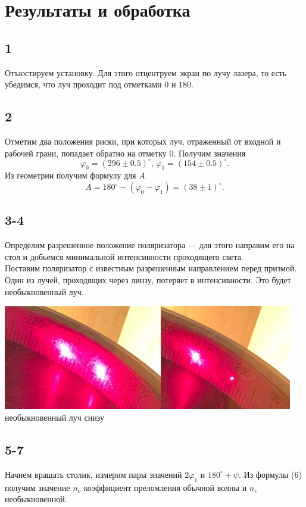 \section{Результаты и обработка}
\subsection{1}
Отъюстируем установку. Для этого отцентруем экран по лучу лазера, то есть убедимся, что луч проходит под отметками $0$ и $180$.
\subsection{2}
Отметим два положения риски, при которых луч, отраженный от входной и рабочей грани, попадает обратно на отметку $0$. Получим значения
\[\varphi_0 = (296\pm0.5)^\circ,\,\varphi_1 = (154\pm0.5)^\circ.\]
Из геометрии получим формулу для $A$
\[A=180^\circ-(\varphi_0-\varphi_1) = (38\pm1)^\circ.\]
\subsection{3-4}
Определим разрешенное положение поляризатора --- для этого направим его на стол и добьемся минимальной интенсивности проходящего света.\\
Поставим поляризатор с известным разрешенным направлением перед призмой. Один из лучей, проходящих через линзу, потеряет в интенсивности. Это будет необыкновенный луч.

\begin{center}
\includegraphics[width=0.95\textwidth]{3.png}
необыкновенный луч снизу
\end{center}

\subsection{5-7}
Начнем вращать столик, измерим пары значений $2\varphi_1$ и $180^\circ+\psi$. Из формулы (6) получим значение $n_o$ коэффициент преломления обычной волны и $n_e$ необыкновенной. 

